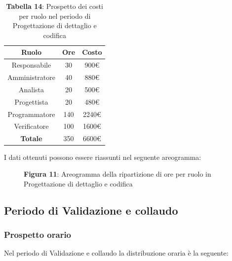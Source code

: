 \begin{table}[H]
	\centering
	\renewcommand{\arraystretch}{1.5}
	\begin{tabular}{|c|c|c|}
		\hline
		\rowcolor{lighter-grayer}
Ruolo & Ore & Costo \\ \hline
Responsabile & 30 & 900\euro \\ \hline
Amministratore & 40 & 880\euro \\ \hline
Analista & 20 & 500\euro \\ \hline
Progettista & 20 & 480\euro \\ \hline
Programmatore & 140 & 2240\euro \\ \hline
Verificatore & 100 & 1600\euro \\ \hline
\textbf{Totale} & 350 & 6600\euro \\ \hline
	\end{tabular}
	\caption*{\textbf{Tabella 14}: Prospetto dei costi per ruolo nel periodo di Progettazione di dettaglio e codifica\\}
\end{table}

I dati ottenuti possono essere riassunti nel seguente areogramma:


\begin{figure}[H]
	\centering
	\caption*{\textbf{Figura 11}: Areogramma della ripartizione di ore per ruolo in Progettazione di dettaglio e codifica}
	\label{fig:Figura10}
\end{figure}

\subsection{Periodo di Validazione e collaudo}
\subsubsection{Prospetto orario}
Nel periodo di Validazione e collaudo la distribuzione oraria è la seguente:

